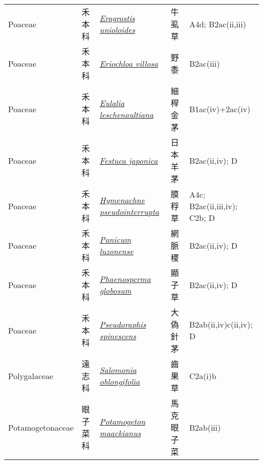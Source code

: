 {\begin{longtable}{p{2.5cm}p{2.5cm}p{4.5cm}p{2.5cm}p{3cm}}
    Poaceae & 禾本科 & \href{http://www.theplantlist.org/tpl1.1/search?q=Eragrostis+unioloides}{\textit{Eragrostis unioloides} } & 牛虱草 & A4d; B2ac(ii,iii) \index{Eragrostis@\textit{Eragrostis}!unioloides@\textit{unioloides}}  \index{牛虱草} \\
    Poaceae & 禾本科 & \href{http://www.theplantlist.org/tpl1.1/search?q=Eriochloa+villosa}{\textit{Eriochloa villosa} } & 野黍 & B2ac(iii) \index{Eriochloa@\textit{Eriochloa}!villosa@\textit{villosa}}  \index{野黍} \\
    Poaceae & 禾本科 & \href{http://www.theplantlist.org/tpl1.1/search?q=Eulalia+leschenaultiana}{\textit{Eulalia leschenaultiana} } & 細稈金茅 & B1ac(iv)+2ac(iv) \index{Eulalia@\textit{Eulalia}!leschenaultiana@\textit{leschenaultiana}}  \index{細稈金茅} \\
    Poaceae & 禾本科 & \href{http://www.theplantlist.org/tpl1.1/search?q=Festuca+japonica}{\textit{Festuca japonica} } & 日本羊茅 & B2ac(ii,iv); D \index{Festuca@\textit{Festuca}!japonica@\textit{japonica}}  \index{日本羊茅} \\
    Poaceae & 禾本科 & \href{http://www.theplantlist.org/tpl1.1/search?q=Hymenachne+pseudointerrupta}{\textit{Hymenachne pseudointerrupta} } & 膜稃草 & A4c; B2ac(ii,iii,iv); C2b; D \index{Hymenachne@\textit{Hymenachne}!pseudointerrupta@\textit{pseudointerrupta}}  \index{膜稃草} \\
    Poaceae & 禾本科 & \href{http://www.theplantlist.org/tpl1.1/search?q=Panicum+luzonense}{\textit{Panicum luzonense} } & 網脈稷 & B2ac(ii,iv); D \index{Panicum@\textit{Panicum}!luzonense@\textit{luzonense}}  \index{網脈稷} \\
    Poaceae & 禾本科 & \href{http://www.theplantlist.org/tpl1.1/search?q=Phaenosperma+globosum}{\textit{Phaenosperma globosum} } & 顯子草 & B2ac(ii,iv); D \index{Phaenosperma@\textit{Phaenosperma}!globosum@\textit{globosum}}  \index{顯子草} \\
    Poaceae & 禾本科 & \href{http://www.theplantlist.org/tpl1.1/search?q=Pseudoraphis+spinescens}{\textit{Pseudoraphis spinescens} } & 大偽針茅 & B2ab(ii,iv)c(ii,iv); D \index{Pseudoraphis@\textit{Pseudoraphis}!spinescens@\textit{spinescens}}  \index{大偽針茅} \\
    Polygalaceae & 遠志科 & \href{http://www.theplantlist.org/tpl1.1/search?q=Salomonia+oblongifolia}{\textit{Salomonia oblongifolia} } & 齒果草 & C2a(i)b \index{Salomonia@\textit{Salomonia}!oblongifolia@\textit{oblongifolia}}  \index{齒果草} \\
    Potamogetonaceae & 眼子菜科 & \href{http://www.theplantlist.org/tpl1.1/search?q=Potamogeton+maackianus}{\textit{Potamogeton maackianus} } & 馬克眼子菜 & B2ab(iii) \index{Potamogeton@\textit{Potamogeton}!maackianus@\textit{maackianus}}  \index{馬克眼子菜} \\

\end{longtable}}
